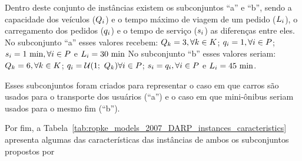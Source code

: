 Dentro deste conjunto de instâncias existem os subconjuntos ``a'' e ``b'',
sendo a capacidade dos veículos ($Q_i$) e o tempo máximo de 
viagem de um pedido ($L_i$), o carregamento dos pedidos 
($q_i$) e o tempo de serviço ($s_i$) as diferenças entre 
eles.
No subconjunto ``a'' esses valores recebem: $Q_{k} = 3, \forall
k \in K$; $q_i = 1, \forall i \in
P$; $\serviceTime_\request = 1\ \text{min}, \forall \request \in 
\requests$ e $L_i = 30\ \text{min}$ 
No subconjunto ``b'' esses valores seriam: $Q_{k} = 6, \forall
k \in K$; $q_i = \mathcal{U}(1;\ Q_{k}) \forall i \in P$; 
$s_i = q_i, \forall i \in P$ e
$L_i = 45\ \text{min}$.

Esses subconjuntos foram criados para representar o caso em que carros são
usados para o transporte dos usuários (``a'') e o caso em que mini-ônibus 
seriam usados para o mesmo fim (``b'').

Por fim, a Tabela~\ref{tab:ropke_models_2007_DARP_instances_caracteristics}
apresenta algumas das características das instâncias de ambos os subconjuntos
propostos por \textcite{ropke_models_2007}


